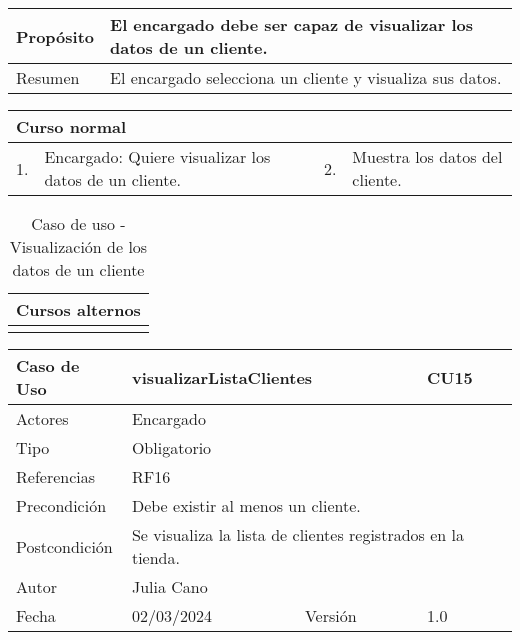 \begin{table}[H]
	\centering
	\begin{tabular}{| m{} | m{} | m{} | m{} |}
		\hline
		Propósito & \multicolumn{3}{m{0.67\textwidth}|}{El encargado debe ser capaz de visualizar los datos de un cliente.}  \\ 
		\hline
		Resumen & \multicolumn{3}{m{0.67\textwidth}|}{El encargado selecciona un cliente y visualiza sus datos.} \\ 
		\hline
	\end{tabular}
\end{table}


\begin{table}[H]
	\centering
	\begin{tabular}{| m{} | m{} | m{} | m{} |}
		\hline
		\multicolumn{4}{|m{0.9\textwidth}|}{Curso normal}     \\ 
		\hline
		1. & Encargado: Quiere visualizar los datos de un cliente. & 2. &  Muestra los datos del cliente.  \\ 
		\hline
	\end{tabular}
\end{table}

\begin{table}[H]
	\centering
	\begin{tabular}{| m{} | m{} | m{} | m{} |}
		\hline
		\multicolumn{4}{|m{0.9\textwidth}|}{Cursos alternos}     \\ 
		\hline
		& \multicolumn{3}{m{0.67\textwidth}|}{} \\ 
		\hline
	\end{tabular}
	\caption{Caso de uso - Visualización de los datos de un cliente}
\end{table}

\newpage


\begin{table}[H]
	\centering
	\begin{tabular}{| m{} | m{} | m{} | m{}|}
		\hline
		\rowcolor{grayshade} Caso de Uso & \multicolumn{2}{|m{0.43\textwidth}|}{visualizarListaClientes} &  CU15\\ 
		\hline
		Actores & \multicolumn{3}{l|}{Encargado} \\ 
		\hline
		Tipo & \multicolumn{3}{l|}{Obligatorio} \\ 
		\hline
		Referencias & \multicolumn{3}{l|}{RF16} \\ 
		\hline
		Precondición & \multicolumn{3}{m{0.67\textwidth}|}{Debe existir al menos un cliente.} \\ 
		\hline
		Postcondición & \multicolumn{3}{m{0.67\textwidth}|}{Se visualiza la lista de clientes registrados en la tienda.} \\ 
		\hline
		Autor & \multicolumn{3}{l|}{Julia Cano} \\ 
		\hline
		Fecha & 02/03/2024 & Versión & 1.0 \\
		\hline
	\end{tabular}
\end{table}

